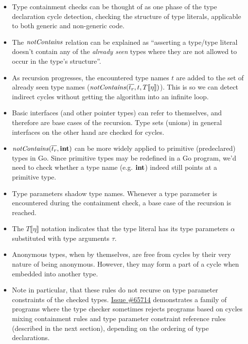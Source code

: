 \documentclass[12pt]{article}
\begin{document}
\begin{itemize}
    \item Type containment checks can be thought of as one phase of the type
          declaration cycle detection, checking the structure of type literals,
          applicable to both generic and non-generic code.

    \item The $\mathit{notContains}$ relation can be explained as ``asserting a type/type
          literal doesn't contain any of the \emph{already seen} types where they are
          not allowed to occur in the type's structure''.

    \item As recursion progresses, the encountered type names $t$ are added to
          the set of already seen type names ($\mathit{notContains}(\overline{t_r}, t, T
              \llbracket\eta\rrbracket)$). This is so we can detect indirect cycles
          without getting the algorithm into an infinite loop.

    \item Basic interfaces (and other pointer types) can refer to themselves, and
          therefore are base cases of the recursion. Type sets (unions) in
          general interfaces on the other hand are checked for cycles.

    \item $\mathit{notContains}(\overline{t_r}, \texttt{\bf int})$ can be more widely applied to primitive
          (predeclared) types in Go. Since primitive types may be redefined in a Go
          program, we'd need to check whether a type name (e.g. $\texttt{\bf int}$) indeed
          still points at a primitive type.

    \item Type parameters shadow type names. Whenever a type parameter is
          encountered during the containment check, a base case of the recursion is
          reached.

    \item The $T \llbracket\eta\rrbracket$ notation indicates that the type
          literal has its type parameters $\alpha$ substituted with type arguments
          $\tau$.

    \item Anonymous types, when by themselves, are free from cycles by their
          very nature of being anonymous. However, they may form a part of a
          cycle when embedded into another type.

    \item Note in particular, that these rules do not recurse on type parameter
          constraints of the checked types.
          \href{https://github.com/golang/go/issues/65714}{Issue \#65714}
          demonstrates a family of programs where the type checker sometimes
          rejects programs based on cycles mixing containment rules and type
          parameter constraint reference rules (described in the next section),
          depending on the ordering of type declarations.
\end{itemize}
\end{document}
